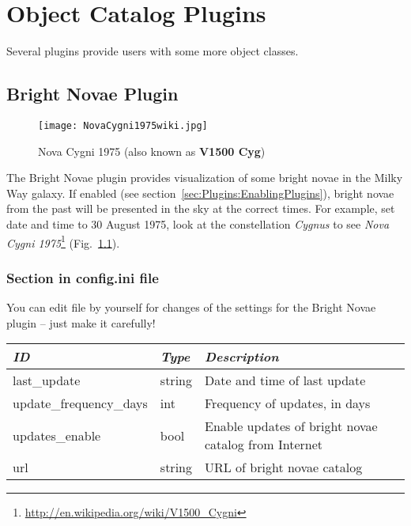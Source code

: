 
\chapter{Object Catalog Plugins}
Several plugins provide users with some more object classes. 


\section{Bright Novae Plugin}
\label{sec:plugins:BrightNovae}

\begin{figure}[ht]
\texttt{[image: NovaCygni1975wiki.jpg]}
\caption{Nova Cygni 1975 (also known as \textbf{V1500 Cyg})}
\label{fig:NovaCygni1975}
\end{figure}


\noindent The Bright Novae plugin provides visualization of some
bright novae in the Milky Way galaxy.
If enabled (see section~\ref{sec:Plugins:EnablingPlugins}), bright
novae from the past will be presented in the sky at the correct
times. For example, set date and time to 30 August 1975, look at the constellation \emph{Cygnus} to see
\emph{Nova Cygni 1975}\footnote{\url{http://en.wikipedia.org/wiki/V1500_Cygni}} (Fig.~\ref{fig:NovaCygni1975}).


\subsection{Section  in config.ini file}

You can edit  file by yourself for changes of the
settings for the Bright Novae plugin -- just make it carefully!

\noindent%
\begin{tabularx}{\textwidth}{l|l|X}\toprule
\emph{ID}            & \emph{Type} & \emph{Description}\\\midrule
last\_update            & string & Date and time of last update\\%
update\_frequency\_days & int    & Frequency of updates, in days\\%
updates\_enable         & bool   & Enable updates of bright novae catalog from Internet \\%
url                     & string & URL of bright novae catalog \\\bottomrule
\end{tabularx}

